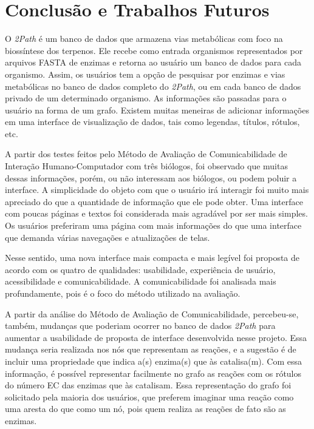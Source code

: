 \chapter{Conclusão e Trabalhos Futuros}

\indent O \textit{2Path} é um banco de dados que armazena vias metabólicas com foco na biossíntese dos terpenos. Ele recebe como entrada organismos representados por arquivos FASTA de enzimas e retorna ao usuário um banco de dados para cada organismo. Assim, os usuários tem a opção de pesquisar por enzimas e vias metabólicas no banco de dados completo do \textit{2Path}, ou em cada banco de dados privado de um determinado organismo. As informações são passadas para o usuário na forma de um grafo. Existem muitas meneiras de adicionar informações em uma interface de visualização de dados, tais como legendas, títulos, rótulos, etc. 

\indent A partir dos testes feitos pelo Método de Avaliação de Comunicabilidade de Interação Humano-Computador com três biólogos, foi observado que muitas dessas informações, porém, ou não interessam aos biólogos, ou podem poluir a interface. A simplicidade do objeto com que o usuário irá interagir foi muito mais apreciado do que a quantidade de informação que ele pode obter. Uma interface com poucas páginas e textos foi considerada mais agradável por ser mais simples. Os usuários preferiram uma página com mais informações do que uma interface que demanda várias navegações e atualizações de telas. 

\indent Nesse sentido, uma nova interface mais compacta e mais legível foi proposta de acordo com os quatro de  qualidades: usabilidade, experiência de usuário, acessibilidade e comunicabilidade. A comunicabilidade foi analisada mais profundamente, pois é o foco do método utilizado na avaliação.

\indent A partir da análise do Método de Avaliação de Comunicabilidade, percebeu-se, também, mudanças que poderiam ocorrer no banco de dados \textit{2Path} para aumentar a usabilidade de proposta de interface desenvolvida nesse projeto. Essa mudança seria realizada nos nós que representam as reações, e a sugestão é de incluir uma propriedade que indica a(s) enzima(s) que às catalisa(m). Com essa informação, é possível representar facilmente no grafo as reações com os rótulos do número EC das enzimas que às catalisam. Essa representação do grafo foi solicitado pela maioria dos usuários, que preferem imaginar uma reação como uma aresta do que como um nó, pois quem realiza as reações de fato são as enzimas.